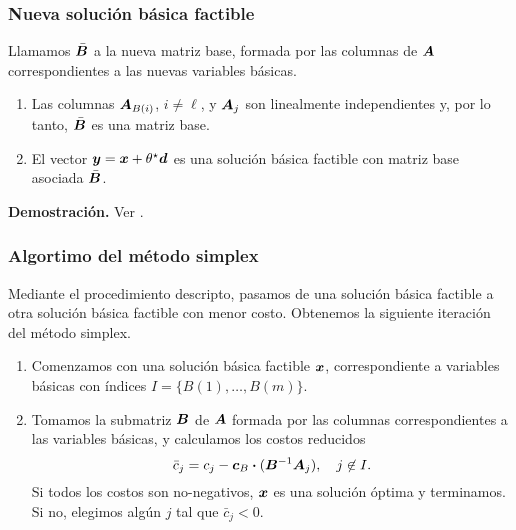 \documentclass[aspectratio=169,12pt,spanish]{beamer}
\newcounter{savedenum}
\newcommand*{\saveenum}{\setcounter{savedenum}{\theenumi}}
\begin{document}
\begin{frame}
\frametitle{Nueva solución básica factible}

Llamamos $\bar {\bm{B}}$ a la nueva matriz base, formada por las columnas de $\bm{A}$ correspondientes a las nuevas variables básicas.

\begin{theorem}
\begin{enumerate}
\item Las columnas $\bm{A}_{B(i)}$, $i \neq \ell$, y $\bm{A}_j$ son linealmente independientes y, por lo tanto, $\bar {\bm{B}}$ es una matriz base.
\item El vector $\bm{y} = \bm{x} + \theta^\star \bm{d}$ es una solución básica factible con matriz base asociada $\bar {\bm{B}}$.
\end{enumerate}
\end{theorem}

\textbf{Demostración.} Ver \cite[Teorema 3.2]{Bertsimas1997}.

\end{frame}


\begin{frame}
\frametitle{Algortimo del método simplex}

Mediante el procedimiento descripto, pasamos de una solución básica factible a otra solución básica factible con menor costo.
Obtenemos la siguiente iteración del método simplex.

\begin{enumerate}
\item Comenzamos con una solución básica factible $\bm{x}$, correspondiente a variables básicas con índices $I = \{B(1), \dots, B(m)\}$.
\item Tomamos la submatriz $\bm{B}$ de $\bm{A}$ formada por las columnas correspondientes a las variables básicas, y calculamos los costos reducidos
    $$\bar c_j = c_j - \bm{c}_B \boldsymbol{\cdot} (\bm{B}^{-1} \bm{A}_j), \quad j \not\in I.$$
Si todos los costos son no-negativos, $\bm{x}$ es una solución óptima y terminamos. Si no, elegimos algún $j$ tal que $\bar c_j < 0$.
\saveenum
\end{enumerate}

\end{frame}

\end{document}
